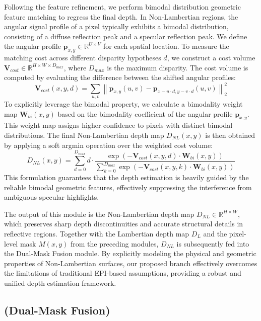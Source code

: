 Following the feature refinement, we perform bimodal distribution geometric feature matching to regress the final depth. In Non-Lambertian regions, the angular signal profile of a pixel typically exhibits a bimodal distribution, consisting of a diffuse reflection peak and a specular reflection peak. We define the angular profile $\mathbf{p}_{x,y} \in \mathbb{R}^{U \times V}$ for each spatial location. To measure the matching cost across different disparity hypotheses $d$, we construct a cost volume $\mathbf{V}_{cost} \in \mathbb{R}^{H \times W \times D_{max}}$, where $D_{max}$ is the maximum disparity. The cost volume is computed by evaluating the difference between the shifted angular profiles:
\begin{equation}
\label{eq:eq13}
\mathbf{V}_{cost}(x,y,d) = \sum_{u,v} \left\| \mathbf{p}_{x,y}(u,v) - \mathbf{p}_{x-u \cdot d, y-v \cdot d}(u,v) \right\|_2^2
\end{equation}
To explicitly leverage the bimodal property, we calculate a bimodality weight map $\mathbf{W}_{bi}(x,y)$ based on the bimodality coefficient of the angular profile $\mathbf{p}_{x,y}$. This weight map assigns higher confidence to pixels with distinct bimodal distributions. The final Non-Lambertian depth map $D_{NL}(x,y)$ is then obtained by applying a soft argmin operation over the weighted cost volume:
\begin{equation}
\label{eq:eq14}
D_{NL}(x,y) = \sum_{d=0}^{D_{max}} d \cdot \frac{\exp(-\mathbf{V}_{cost}(x,y,d) \cdot \mathbf{W}_{bi}(x,y))}{\sum_{k=0}^{D_{max}} \exp(-\mathbf{V}_{cost}(x,y,k) \cdot \mathbf{W}_{bi}(x,y))}
\end{equation}
This formulation guarantees that the depth estimation is heavily guided by the reliable bimodal geometric features, effectively suppressing the interference from ambiguous specular highlights.

The output of this module is the Non-Lambertian depth map $D_{NL} \in \mathbb{R}^{H \times W}$, which preserves sharp depth discontinuities and accurate structural details in reflective regions. Together with the Lambertian depth map $D_L$ and the pixel-level mask $M(x,y)$ from the preceding modules, $D_{NL}$ is subsequently fed into the Dual-Mask Fusion module. By explicitly modeling the physical and geometric properties of Non-Lambertian surfaces, our proposed branch effectively overcomes the limitations of traditional EPI-based assumptions, providing a robust and unified depth estimation framework.

\subsection{(Dual-Mask Fusion)}

